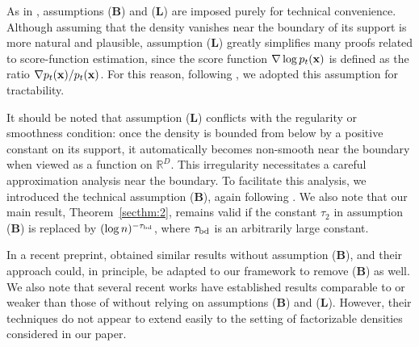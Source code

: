 \documentclass[twoside,11pt]{article}
\newcommand{\bB}{{\bf B}}
\newcommand{\bL}{{\bf L}}
\newcommand{\bx}{{\bf x}}
\newcommand{\bbR}{{\mathbb R}}
\begin{document}
As in \citet{oko2023diffusion}, assumptions (\bB) and (\bL) are imposed purely for technical convenience. Although assuming that the density vanishes near the boundary of its support is more natural and plausible, assumption (\bL) greatly simplifies many proofs related to score-function estimation, since the score function $\nabla \log p_t(\bx)$ is defined as the ratio $\nabla p_t(\bx) / p_t(\bx)$. For this reason, following \citet{oko2023diffusion}, we adopted this assumption for tractability.

It should be noted that assumption (\bL) conflicts with the regularity or smoothness condition: once the density is bounded from below by a positive constant on its support, it automatically becomes non-smooth near the boundary when viewed as a function on $\bbR^D$.
This irregularity necessitates a careful approximation analysis near the boundary. To facilitate this analysis, we introduced the technical assumption (\bB), again following \citet{oko2023diffusion}. We also note that our main result, Theorem~\ref{secthm:2}, remains valid if the constant $\tau_2$ in assumption (\bB) is replaced by $(\log n)^{-\tau_{\rm bd}}$, where $\tau_{\rm bd}$ is an arbitrarily large constant.

In a recent preprint, \citet{fan2025optimal} obtained similar results without assumption (\bB), and their approach could, in principle, be adapted to our framework to remove (\bB) as well. We also note that several recent works \citep{zhang2024minimax, wibisono2024, fu2025approximation} have established results comparable to or weaker than those of \citet{oko2023diffusion} without relying on assumptions (\bB) and (\bL). However, their techniques do not appear to extend easily to the setting of factorizable densities considered in our paper.

\end{document}
